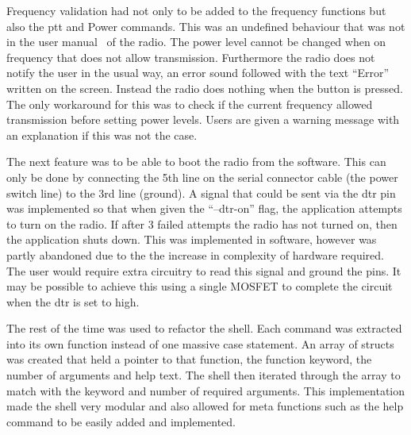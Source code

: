 Frequency validation had not only to be added to the frequency functions but also the \gls{ptt} and Power commands. This was an undefined behaviour that was not in the user manual~\cite{user_manual} of the radio. The power level cannot be changed when on frequency that does not allow transmission. Furthermore the radio does not notify the user in the usual way, an error sound followed with the text ``Error'' written on the screen. Instead the radio does nothing when the button is pressed. The only workaround for this was to check if the current frequency allowed transmission before setting power levels. Users are given a warning message with an explanation if this was not the case.

The next feature was to be able to boot the radio from the software. This can only be done by connecting the 5th line on the serial connector cable (the power switch line) to the 3rd line (ground). A signal that could be sent via the \gls{dtr} pin was implemented so that when given the ``--dtr-on'' flag, the application attempts to turn on the radio. If after 3 failed attempts the radio has not turned on, then the application shuts down. This was implemented in software, however was partly abandoned due to the the increase in complexity of hardware required. The user would require extra circuitry to read this signal and ground the pins. It may be possible to achieve this using a single \gls{MOSFET} to complete the circuit when the \gls{dtr} is set to high.

The rest of the time was used to refactor the shell. Each command was extracted into its own function instead of one massive case statement. An array of structs was created that held a pointer to that function, the function keyword, the number of arguments and help text. The shell then iterated through the array to match with the keyword and number of required arguments. This implementation made the shell very modular and also allowed for meta functions such as the help command to be easily added and implemented.